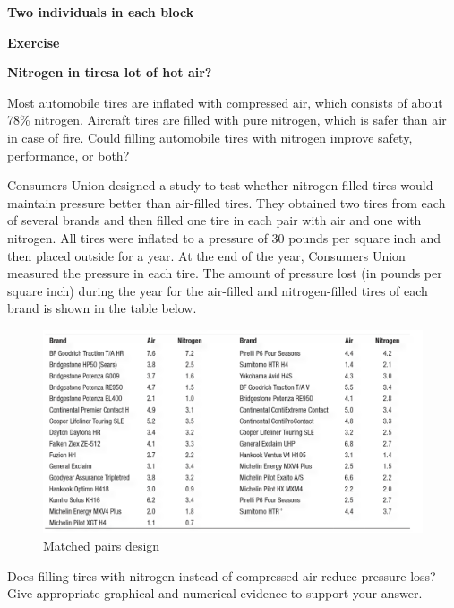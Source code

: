 \documentclass[a4paper, 12pt,twoside]{book}
\begin{document}
\begin{enumerate}[(1)]
    
  \textbf{Two individuals in each block}
  \vspace{0.3cm}
  
    \begin{minipage}{\textwidth}
    \hspace{-1cm}
  \colorbox{champagne}{\parbox{\textwidth}{
  
        \textbf{Exercise}
      \vspace{0.3cm}
      
      \textbf{Nitrogen in tires\textemdash a lot of hot air?}
 
   Most automobile tires are inflated with compressed air, which consists of about 78\% nitrogen. Aircraft tires are filled with pure nitrogen, which is safer than air in case of fire. Could filling automobile tires with nitrogen improve safety, performance, or both?     
   
   Consumers Union designed a study to test whether nitrogen-filled tires would maintain pressure better than air-filled tires. They obtained two tires from each of several brands and then filled one tire in each pair with air and one with nitrogen. All tires were inflated to a pressure of 30 pounds per square inch and then placed outside for a year. At the end of the year, Consumers Union measured the pressure in each tire. The amount of pressure lost (in pounds per square inch) during the year for the air-filled and nitrogen-filled tires of each brand is shown in the table below.
   \begin{figure}[H]
       \centering
       \includegraphics[scale=0.6]{MatchedPairsDesign}
       \caption{Matched pairs design}
       \label{MatchedPairsDesign}
   \end{figure}

  Does filling tires with nitrogen instead of compressed air reduce pressure loss? Give appropriate graphical and numerical evidence to support your answer.    
  }}
   \end{minipage}
   \newpage
   

\end{enumerate}
\end{document}
